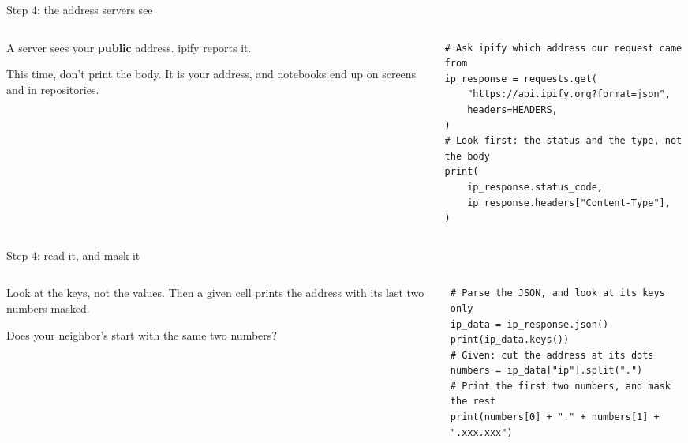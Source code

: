 \documentclass[9pt,aspectratio=169]{beamer}
\begin{document}
\begin{frame}[fragile]{Step 4: the address servers see}
    \begin{columns}[T]
        \begin{column}{0.37\textwidth}
            A server sees your \textbf{public} address. ipify reports it.

            \medskip
            This time, don't print the body. It is your address, and notebooks end up on screens and in repositories.
        \end{column}
        \begin{column}{0.6\textwidth}
\begin{lstlisting}[style=lab]
# Ask ipify which address our request came from
ip_response = requests.get(
    "https://api.ipify.org?format=json",
    headers=HEADERS,
)
# Look first: the status and the type, not the body
print(
    ip_response.status_code,
    ip_response.headers["Content-Type"],
)
\end{lstlisting}
        \end{column}
    \end{columns}
\end{frame}

\begin{frame}[fragile]{Step 4: read it, and mask it}
    \begin{columns}[T]
        \begin{column}{0.37\textwidth}
            Look at the keys, not the values. Then a given cell prints the address with its last two numbers masked.

            \medskip
            Does your neighbor's start with the same two numbers?
        \end{column}
        \begin{column}{0.6\textwidth}
\begin{lstlisting}[style=lab]
# Parse the JSON, and look at its keys only
ip_data = ip_response.json()
print(ip_data.keys())
# Given: cut the address at its dots
numbers = ip_data["ip"].split(".")
# Print the first two numbers, and mask the rest
print(numbers[0] + "." + numbers[1] + ".xxx.xxx")
\end{lstlisting}
        \end{column}
    \end{columns}
\end{frame}
\end{document}
